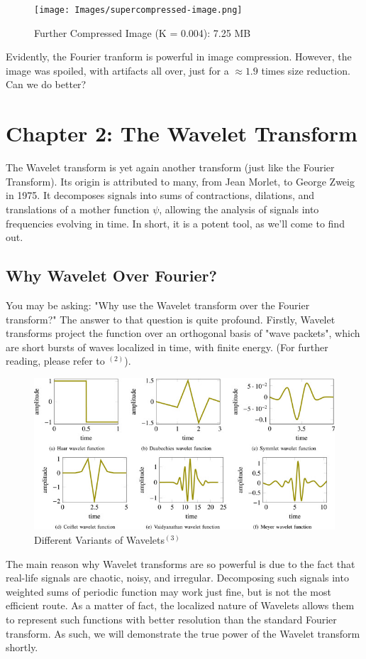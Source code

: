 \documentclass{article}
\begin{document}
\begin{figure}[h]
    \centering
    \texttt{[image: Images/supercompressed-image.png]}
    \caption{Further Compressed Image (K = 0.004): 7.25 MB}
    \label{fig:scd}
\end{figure}
Evidently, the Fourier tranform is powerful in image compression. However, the image was spoiled, with artifacts all over, 
just for a $\approx 1.9$ times size reduction. Can we do better?

\newpage
\section*{Chapter 2: The Wavelet Transform}
The Wavelet transform is yet again another transform (just like the Fourier Transform). Its origin is attributed to many,
from Jean Morlet, to George Zweig in 1975. It decomposes signals into sums of contractions, dilations, and translations of a
mother function $\psi$, allowing the analysis of signals into frequencies evolving in time. In short, it is a potent tool, 
as we'll come to find out. 

\subsection*{Why Wavelet Over Fourier?}
You may be asking: "Why use the Wavelet transform over the Fourier transform?" The answer to that question is quite profound.
Firstly, Wavelet transforms project the function over an orthogonal basis of "wave packets", which are short bursts
of waves localized in time, with finite energy. (For further reading, please refer to $^{(2)}$).
\begin{figure}[h]
    \centering
    \includegraphics[width=0.5\linewidth]{Images/wavelet-types.jpg}
    \caption{Different Variants of Wavelets$^{(3)}$}
    \label{fig:wavelets}
\end{figure}
\newline
The main reason why Wavelet transforms are so powerful is due to the fact that real-life signals are 
chaotic, noisy, and irregular. Decomposing such signals into weighted sums of periodic function may work
just fine, but is not the most efficient route. As a matter of fact, the localized nature of Wavelets
allows them to represent such functions with better resolution than the standard Fourier transform.
As such, we will demonstrate the true power of the Wavelet transform shortly.
\end{document}
